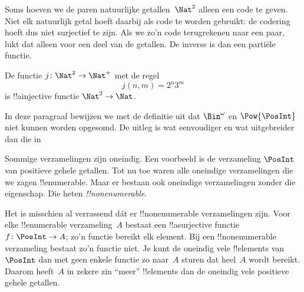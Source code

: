 \documentclass[openany]{memoir}
\begin{document}
Soms hoeven we de paren natuurlijke getallen~$\Nat^2$ alleen een code te geven.
Niet elk natuurlijk getal hoeft daarbij als code te worden gebruikt: de
codering hoeft dus niet surjectief te zijn. Als we zo'n code terugrekenen naar
een paar, lukt dat alleen voor een deel van de getallen. De inverse is dan een
partiële functie.

\begin{ex}
De functie $j\colon \Nat^2 \to \Nat^+$ met de regel
\[
j(n,m) = 2^n3^m
\]
is !!a{injective} functie $\Nat^2 \to \Nat$.
\end{ex}
\endgroup

\begingroup
\def\olfilename{OLP-0033}
\def\olfilepath{content/sets-functions-relations/size-of-sets/}
\hypertarget{unit-OLP-0033}{}





\begin{editorial}
  In deze paragraaf bewijzen we met de definitie uit 
  dat $\Bin^\omega$ en $\Pow{\PosInt}$ niet kunnen worden opgesomd. De
  uitleg is wat eenvoudiger en wat uitgebreider dan die in
\end{editorial}

Sommige verzamelingen zijn oneindig. Een voorbeeld is de verzameling
$\PosInt$ van positieve gehele getallen. Tot nu toe waren alle
oneindige verzamelingen die we zagen !!{enumerable}. Maar er bestaan ook
oneindige verzamelingen zonder die eigenschap. Die heten
\emph{!!{nonenumerable}}.

Het is misschien al verrassend dát er !!{nonenumerable} verzamelingen
zijn. Voor elke !!{enumerable} verzameling~$A$ bestaat een
!!a{surjective} functie $f \colon \PosInt \to A$; zo'n functie bereikt
elk element. Bij een !!{nonenumerable} verzameling bestaat
zo'n functie niet. Je kunt de oneindig vele !!{element}s van~$\PosInt$
dan met geen enkele functie zo naar~$A$ sturen dat heel~$A$ wordt
bereikt. Daarom heeft~$A$ in zekere zin ``meer'' !!{element}s dan de
oneindig vele positieve gehele getallen.
\end{document}
